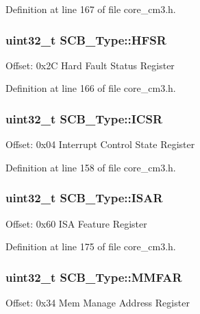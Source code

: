 Definition at line 167 of file core\+\_\+cm3.\+h.

\subsubsection[{\texorpdfstring{H\+F\+SR}{HFSR}}]{ {\bf uint32\+\_\+t} S\+C\+B\+\_\+\+Type\+::\+H\+F\+SR}\hypertarget{struct_s_c_b___type_a7bed53391da4f66d8a2a236a839d4c3d}{}\label{struct_s_c_b___type_a7bed53391da4f66d8a2a236a839d4c3d}
Offset\+: 0x2C Hard Fault Status Register 

Definition at line 166 of file core\+\_\+cm3.\+h.

\subsubsection[{\texorpdfstring{I\+C\+SR}{ICSR}}]{ {\bf uint32\+\_\+t} S\+C\+B\+\_\+\+Type\+::\+I\+C\+SR}\hypertarget{struct_s_c_b___type_a3e66570ab689d28aebefa7e84e85dc4a}{}\label{struct_s_c_b___type_a3e66570ab689d28aebefa7e84e85dc4a}
Offset\+: 0x04 Interrupt Control State Register 

Definition at line 158 of file core\+\_\+cm3.\+h.

\subsubsection[{\texorpdfstring{I\+S\+AR}{ISAR}}]{ {\bf uint32\+\_\+t} S\+C\+B\+\_\+\+Type\+::\+I\+S\+AR}\hypertarget{struct_s_c_b___type_a84715ecbe885efa4841d594e7409ccae}{}\label{struct_s_c_b___type_a84715ecbe885efa4841d594e7409ccae}
Offset\+: 0x60 I\+SA Feature Register 

Definition at line 175 of file core\+\_\+cm3.\+h.

\subsubsection[{\texorpdfstring{M\+M\+F\+AR}{MMFAR}}]{ {\bf uint32\+\_\+t} S\+C\+B\+\_\+\+Type\+::\+M\+M\+F\+AR}\hypertarget{struct_s_c_b___type_ac49b24b3f222508464f111772f2c44dd}{}\label{struct_s_c_b___type_ac49b24b3f222508464f111772f2c44dd}
Offset\+: 0x34 Mem Manage Address Register 

